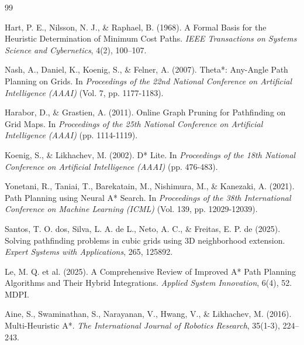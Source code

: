 \documentclass[../BTL.tex]{subfiles}
\begin{document}
\begin{thebibliography}{99}

Hart, P. E., Nilsson, N. J., \& Raphael, B. (1968). A Formal Basis for the Heuristic Determination of Minimum Cost Paths. \textit{IEEE Transactions on Systems Science and Cybernetics}, 4(2), 100–107.

Nash, A., Daniel, K., Koenig, S., \& Felner, A. (2007). Theta*: Any-Angle Path Planning on Grids. In \textit{Proceedings of the 22nd National Conference on Artificial Intelligence (AAAI)} (Vol. 7, pp. 1177-1183).

Harabor, D., \& Grastien, A. (2011). Online Graph Pruning for Pathfinding on Grid Maps. In \textit{Proceedings of the 25th National Conference on Artificial Intelligence (AAAI)} (pp. 1114-1119).

Koenig, S., \& Likhachev, M. (2002). D* Lite. In \textit{Proceedings of the 18th National Conference on Artificial Intelligence (AAAI)} (pp. 476-483).

Yonetani, R., Taniai, T., Barekatain, M., Nishimura, M., \& Kanezaki, A. (2021). Path Planning using Neural A* Search. In \textit{Proceedings of the 38th International Conference on Machine Learning (ICML)} (Vol. 139, pp. 12029-12039).

Santos, T. O. dos, Silva, L. A. de L., Neto, A. C., \& Freitas, E. P. de (2025). Solving pathfinding problems in cubic grids using 3D neighborhood extension. \textit{Expert Systems with Applications}, 265, 125892.

Le, M. Q. et al. (2025). A Comprehensive Review of Improved A* Path Planning Algorithms and Their Hybrid Integrations. \textit{Applied System Innovation}, 6(4), 52. MDPI.

Aine, S., Swaminathan, S., Narayanan, V., Hwang, V., \& Likhachev, M. (2016). Multi-Heuristic A*. \textit{The International Journal of Robotics Research}, 35(1-3), 224–243.

\end{thebibliography}
\end{document}
